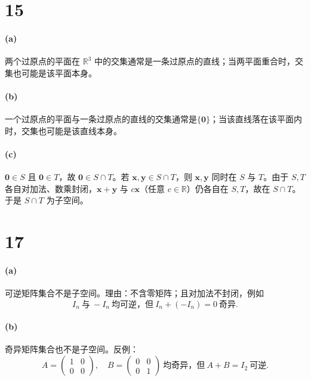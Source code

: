 \documentclass[12pt]{ctexart}
\begin{document}
\section*{15}
\paragraph{(a)} 两个过原点的平面在 $\mathbb{R}^3$ 中的交集通常是一条过原点的直线；当两平面重合时，交集也可能是该平面本身。

\paragraph{(b)} 一个过原点的平面与一条过原点的直线的交集通常是$\{\mathbf{0}\}$；当该直线落在该平面内时，交集也可能是该直线本身。

\paragraph{(c)} $\mathbf{0}\in S$ 且 $\mathbf{0}\in T$，故 $\mathbf{0}\in S\cap T$。若 $\mathbf{x},\mathbf{y}\in S\cap T$，则 $\mathbf{x},\mathbf{y}$ 同时在 $S$ 与 $T$。由于 $S,T$ 各自对加法、数乘封闭，$\mathbf{x}+\mathbf{y}$ 与 $c\mathbf{x}$（任意 $c\in\mathbb{R}$）仍各自在 $S,T$，故在 $S\cap T$。于是 $S\cap T$ 为子空间。

\section*{17}
\paragraph{(a)} 可逆矩阵集合不是子空间。理由：不含零矩阵；且对加法不封闭，例如
\[
I_n\ \text{与}\ -I_n\ \text{均可逆，但}\ I_n+(-I_n)=0\ \text{奇异}.
\]

\paragraph{(b)} 奇异矩阵集合也不是子空间。反例：
\[
A=\begin{pmatrix}1&0\\0&0\end{pmatrix},\quad
B=\begin{pmatrix}0&0\\0&1\end{pmatrix}\ \text{均奇异，但}\ A+B=I_2\ \text{可逆}.\]
\end{document}
